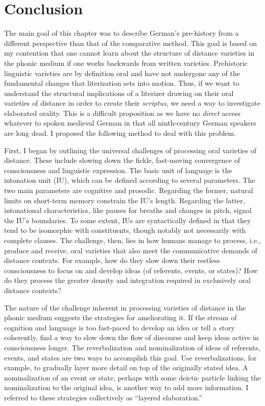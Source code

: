 \section{Conclusion}\label{sec:6.3}

The main goal of this chapter was to describe German’s pre-history from a different perspective than that of the comparative method. This goal is based on my contention that one cannot learn about the structure of distance varieties in the phonic medium if one works backwards from written varieties. Prehistoric linguistic varieties are by definition oral and have not undergone any of the fundamental changes that literization sets into motion. Thus, if we want to understand the structural implications of a literizer drawing on their oral varieties of distance in order to create their \textit{scriptus}, we need a way to investigate elaborated orality. This is a difficult proposition as we have no \textit{direct} access whatever to spoken medieval German in that all ninth-century German speakers are long dead. I proposed the following method to deal with this problem.

First, I began by outlining the universal challenges of processing oral varieties of distance. These include slowing down the fickle, fast-moving convergence of consciousness and linguistic expression. The basic unit of language is the intonation unit (IU), which can be defined according to several parameters. The two main parameters are cognitive and prosodic. Regarding the former, natural limits on short-term memory constrain the IU’s length. Regarding the latter, intonational characteristics, like pauses for breaths and changes in pitch, signal the IU’s boundaries. To some extent, IUs are syntactically defined in that they tend to be isomorphic with constituents, though notably not necessarily with complete clauses. The challenge, then, lies in how humans manage to process, i.e., produce and receive, oral varieties that also meet the communicative demands of distance contexts. For example, how do they slow down their restless consciousness to focus on and develop ideas (of referents, events, or states)? How do they process the greater density and integration required in exclusively oral distance contexts?

The nature of the challenge inherent in processing varieties of distance in the phonic medium suggests the strategies for ameliorating it. If the stream of cognition and language is too fast-paced to develop an idea or tell a story coherently, find a way to slow down the flow of discourse and keep ideas active in consciousness longer. The reverbalization and nominalization of ideas of referents, events, and states are two ways to accomplish this goal. Use reverbalizations, for example, to gradually layer more detail on top of the originally stated idea. A nominalization of an event or state, perhaps with some deictic particle linking the nominalization to the original idea, is another way to add more information. I referred to these strategies collectively as “layered elaboration.”

